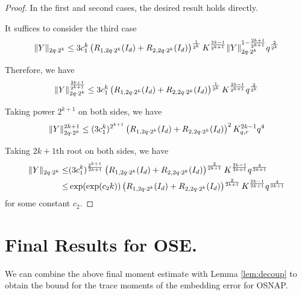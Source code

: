 \documentclass[11pt]{amsart}
\numberwithin{equation}{section}
\numberwithin{equation}{section}
\DeclarePairedDelimiter{\norm}{\lVert}{\rVert}
\begin{document}
\begin{proof}
In the first and second cases, the desired result holds directly.

It suffices to consider the third case
\begin{align*}
    \norm{Y}_{2q\cdot 2^k} \le 3c_{1}^k\left(R_{1,2q \cdot 2^k}(I_d)+R_{2,2q \cdot 2^k}(I_d)\right)^{\frac{1}{2^k}}K^{\frac{2k-1}{2^{k+1}}} \norm{Y}_{2q\cdot 2^k}^{1-\frac{2k+1}{2^{k+1}}}q^{\frac{2}{2^k}}
\end{align*}

Therefore, we have
\begin{align*}
    \norm{Y}_{2q \cdot 2^k}^{\frac{2k+1}{2^{k+1}}} \le 3c_{1}^k\left(R_{1,2q \cdot 2^k}(I_d)+R_{2,2q \cdot 2^k}(I_d)\right)^{\frac{1}{2^k}}K^{\frac{2k-1}{2^{k+1}}} q^{\frac{2}{2^k}}
\end{align*}

Taking power $2^{k+1}$ on both sides, we have
\begin{align*}
    \norm{Y}_{2q \cdot 2^k}^{2k+1} \le (3c_{1}^k)^{2^{k+1}}\left(R_{1,2q \cdot 2^k}(I_d)+R_{2,2q \cdot 2^k}(I_d)\right)^{2}K_{q,r}^{2k-1} q^{4}
\end{align*}

Taking $2k+1$th root on both sides, we have
\begin{align*}
    \norm{Y}_{2q \cdot 2^k} \le &(3c_{1}^k)^{\frac{2^{k+1}}{2k+1}}\left(R_{1,2q \cdot 2^k}(I_d)+R_{2,2q \cdot 2^k}(I_d)\right)^{\frac{2}{2k+1}}K^{\frac{2k-1}{2k+1}} q^{\frac{4}{2k+1}}
    \\\le & \exp(\exp(c_2k))\left(R_{1,2q \cdot 2^k}(I_d)+R_{2,2q \cdot 2^k}(I_d)\right)^{\frac{2}{2k+1}}K^{\frac{2k-1}{2k+1}} q^{\frac{4}{2k+1}}
\end{align*}
for some constant $c_2$.



\end{proof}

\section{Final Results for OSE.} \label{sec:finalres}

We can combine the above final moment estimate with Lemma \ref{lem:decoup} to obtain the bound for the trace moments of the embedding error for OSNAP.
\end{document}
